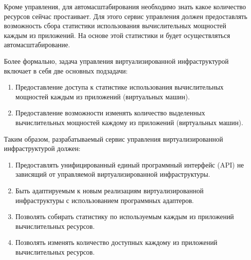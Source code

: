 Кроме управления, для автомасштабирования необходимо знать какое количество ресурсов сейчас простаивает.
Для этого сервис управления должен предоставлять возможность сбора статистики использования вычислительных мощностей каждым из приложений.
На основе этой статистики и будет осуществляться автомасштабирование.

Более формально, задача управления виртуализированной инфраструктурой включает в себя две основных подзадачи:
\begin{enumerate}
    \item Предоставление доступа к статистике использования вычислительных мощностей каждым из приложений (виртуальных машин).
    \item Предоставление возможности изменять количество выделенных вычислительных мощностей каждому из приложений (виртуальных машин).
\end{enumerate}

Таким образом, разрабатываемый сервис управления виртуализированной инфраструктурой должен:
\begin{enumerate}
    \item Предоставлять унифицированный единый программный интерфейс (API) не зависящий от управляемой виртуализированной инфраструктуры.
    \item Быть адаптируемым к новым реализациям виртуализированной инфраструктуры с использованием программных адаптеров.
    \item Позволять собирать статистику по используемым каждым из приложений вычислительных ресурсов.
    \item Позволять изменять количество доступных каждому из приложений вычислительных ресурсов.
\end{enumerate}

